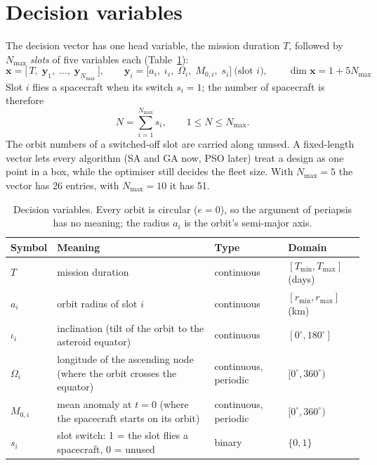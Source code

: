\section{Decision variables}
The decision vector has one head variable, the mission duration $T$, followed by $N_{\max}$
\emph{slots} of five variables each (Table~\ref{tab:vars}):
\begin{equation}
\mathbf{x}=\bigl[\,T,\;\mathbf{y}_1,\;\dots,\;\mathbf{y}_{N_{\max}}\,\bigr],\qquad
\mathbf{y}_i=\bigl[a_i,\;\iota_i,\;\Omega_i,\;M_{0,i},\;s_i\bigr]\ \text{(slot $i$)},\qquad \dim\mathbf{x}=1+5N_{\max}
\label{eq:x}
\end{equation}
Slot $i$ flies a spacecraft when its switch $s_i=1$; the number of spacecraft is therefore
\begin{equation}
N=\sum_{i=1}^{N_{\max}}s_i,\qquad 1\le N\le N_{\max}.
\label{eq:N}
\end{equation}
The orbit numbers of a switched-off slot are carried along unused. A fixed-length vector lets
every algorithm (SA and GA now, PSO later) treat a design as one point in a box, while the
optimiser still decides the fleet size. With $N_{\max}=5$ the vector has 26 entries, with
$N_{\max}=10$ it has 51.

\begin{table}[htbp]
\centering
\caption{Decision variables. Every orbit is circular ($e=0$), so the argument of periapsis has
no meaning; the radius $a_i$ is the orbit's semi-major axis.}
\label{tab:vars}
\footnotesize
\begin{tabularx}{\textwidth}{@{}p{1.3cm}Xp{1.9cm}p{3.2cm}@{}}
\toprule
Symbol & Meaning & Type & Domain \\
\midrule
$T$ & mission duration & continuous & $[T_{\min},T_{\max}]$ (days) \\
$a_i$ & orbit radius of slot $i$ & continuous & $[r_{\min},r_{\max}]$ (km) \\
$\iota_i$ & inclination (tilt of the orbit to the asteroid equator) & continuous & $[0^\circ,180^\circ]$ \\
$\Omega_i$ & longitude of the ascending node (where the orbit crosses the equator) & continuous, periodic & $[0^\circ,360^\circ)$ \\
$M_{0,i}$ & mean anomaly at $t=0$ (where the spacecraft starts on its orbit) & continuous, periodic & $[0^\circ,360^\circ)$ \\
$s_i$ & slot switch: 1 = the slot flies a spacecraft, 0 = unused & binary & $\{0,1\}$ \\
\bottomrule
\end{tabularx}
\end{table}

